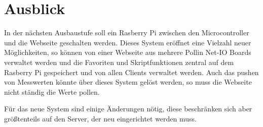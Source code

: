 \chapter{Ausblick}
In der nächsten Ausbaustufe soll ein Rasberry Pi zwischen den Microcontroller
und die Webseite geschalten werden. Dieses System eröffnet eine Vielzahl
neuer Möglichkeiten, so können von einer Webseite aus mehrere Pollin Net-IO
Boards verwaltet werden und die Favoriten und Skriptfunktionen zentral auf dem
Rasberry Pi gespeichert und von allen Clients verwaltet werden. Auch das pushen von
Messwerten könnte über dieses System gelöst werden, so muss die Webseite nicht
ständig die Werte pollen.

Für das neue System sind einige Änderungen nötig, diese beschränken sich aber
größtenteils auf den Server, der neu eingerichtet werden muss.
